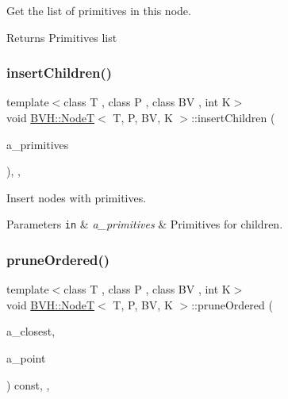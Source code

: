 Get the list of primitives in this node. 

\begin{DoxyReturn}{Returns}
Primitives list 
\end{DoxyReturn}
\mbox{\label{classBVH_1_1NodeT_a83c128d1045ccc23000a8b26f75b3172}} 
\subsubsection{\texorpdfstring{insert\+Children()}{insertChildren()}}
{\footnotesize\ttfamily template$<$class T , class P , class BV , int K$>$ \\
void \hyperlink{classBVH_1_1NodeT}{B\+V\+H\+::\+NodeT}$<$ T, P, BV, K $>$\+::insert\+Children (\begin{DoxyParamCaption}\item[{const std\+::array$<$ \hyperlink{classBVH_1_1NodeT_a19cce6e7fbe85eccb4a3718dd69f49b7}{Primitive\+List}, K $>$ \&}]{a\+\_\+primitives }\end{DoxyParamCaption})\hspace{0.3cm}{\ttfamily [inline]}, {\ttfamily [protected]}, {\ttfamily [noexcept]}}



Insert nodes with primitives. 


\begin{DoxyParams}[1]{Parameters}
\mbox{\tt in}  & {\em a\+\_\+primitives} & Primitives for children. \\
\hline
\end{DoxyParams}
\mbox{\label{classBVH_1_1NodeT_ac4a3be457d66d2673f717f203e60fc08}} 
\subsubsection{\texorpdfstring{prune\+Ordered()}{pruneOrdered()}}
{\footnotesize\ttfamily template$<$class T , class P , class BV , int K$>$ \\
void \hyperlink{classBVH_1_1NodeT}{B\+V\+H\+::\+NodeT}$<$ T, P, BV, K $>$\+::prune\+Ordered (\begin{DoxyParamCaption}\item[{T \&}]{a\+\_\+closest,  }\item[{const \hyperlink{classBVH_1_1NodeT_a6fbb4308c5c55ee170c5f992df7ae1d0}{Vec3} \&}]{a\+\_\+point }\end{DoxyParamCaption}) const\hspace{0.3cm}{\ttfamily [inline]}, {\ttfamily [protected]}, {\ttfamily [noexcept]}}



